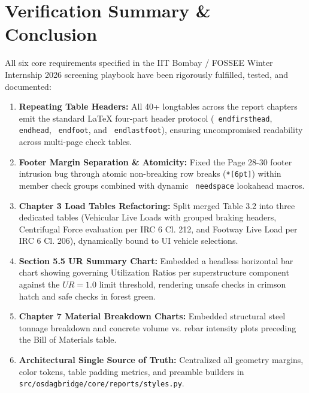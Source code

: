 \documentclass[12pt,a4paper]{article}
\begin{document}
\section{Verification Summary \& Conclusion}

All six core requirements specified in the IIT Bombay / FOSSEE Winter Internship 2026 screening playbook have been rigorously fulfilled, tested, and documented:
\begin{enumerate}\setlength{\itemsep}{2pt}\setlength{\parskip}{0pt}
  \item \textbf{Repeating Table Headers:} All 40+ longtables across the report chapters emit the standard LaTeX four-part header protocol (\texttt{ endfirsthead}, \texttt{ endhead}, \texttt{ endfoot}, and \texttt{ endlastfoot}), ensuring uncompromised readability across multi-page check tables.
  \item \textbf{Footer Margin Separation \& Atomicity:} Fixed the Page 28-30 footer intrusion bug through atomic non-breaking row breaks (\texttt{*[6pt]}) within member check groups combined with dynamic \texttt{ needspace} lookahead macros.
  \item \textbf{Chapter 3 Load Tables Refactoring:} Split merged Table 3.2 into three dedicated tables (Vehicular Live Loads with grouped braking headers, Centrifugal Force evaluation per IRC 6 Cl. 212, and Footway Live Load per IRC 6 Cl. 206), dynamically bound to UI vehicle selections.
  \item \textbf{Section 5.5 UR Summary Chart:} Embedded a headless horizontal bar chart showing governing Utilization Ratios per superstructure component against the $UR = 1.0$ limit threshold, rendering unsafe checks in crimson hatch and safe checks in forest green.
  \item \textbf{Chapter 7 Material Breakdown Charts:} Embedded structural steel tonnage breakdown and concrete volume vs. rebar intensity plots preceding the Bill of Materials table.
  \item \textbf{Architectural Single Source of Truth:} Centralized all geometry margins, color tokens, table padding metrics, and preamble builders in \nolinkurl{src/osdagbridge/core/reports/styles.py}.
\end{enumerate}
\end{document}
